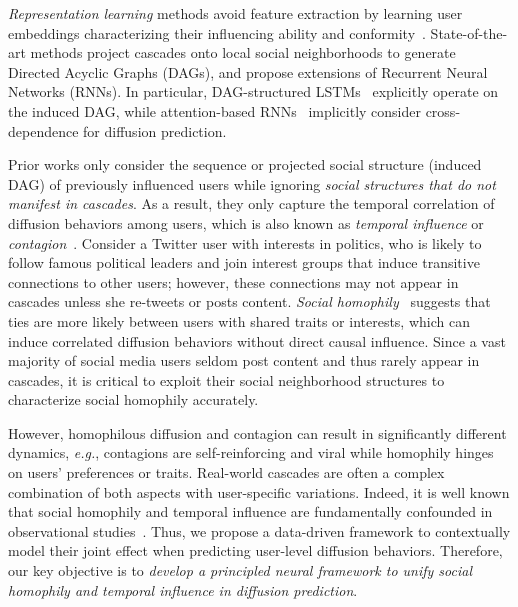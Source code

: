 \documentclass[sigconf]{acmart}
\begin{document}
\textit{Representation learning} methods avoid feature extraction by learning user embeddings characterizing their influencing ability and conformity~\cite{wsdm16,inf2vec}.
State-of-the-art methods project cascades onto local social neighborhoods to generate Directed Acyclic Graphs (DAGs), and propose extensions of Recurrent Neural Networks (RNNs). In particular, DAG-structured LSTMs~\cite{topolstm} explicitly operate on the induced DAG, while attention-based RNNs~\cite{cyanrnn,deepdiffuse,cikm18_attention} implicitly consider cross-dependence for diffusion prediction.











Prior works only consider the sequence or projected social structure (induced DAG) of previously influenced users while ignoring \textit{social structures that do not manifest in cascades}. As a result, they only capture the temporal correlation of diffusion behaviors among users, which is also known as \textit{temporal influence} or \textit{contagion}~\cite{shalizi}.
Consider a Twitter user with interests in politics, who is likely to follow famous political leaders and join interest groups that induce transitive connections to other users; however, these connections may not appear in cascades unless she re-tweets or posts content. 
\textit{Social homophily}~\cite{homophily} suggests that ties are more likely between users with shared traits or interests, which can induce correlated diffusion behaviors without direct causal influence.
Since a vast majority of social media users seldom post content and thus rarely appear in cascades, it is critical to exploit their social neighborhood structures to characterize social homophily accurately.




However, homophilous diffusion and contagion can result in significantly different dynamics, \textit{e.g.}, contagions are self-reinforcing and viral while homophily hinges on users' preferences or traits.
Real-world cascades are often a complex combination of both aspects with user-specific variations.
Indeed, it is well known that social homophily and temporal influence are fundamentally confounded in observational studies~\cite{shalizi}.
Thus, we propose a data-driven framework to contextually model their joint effect when predicting user-level diffusion behaviors.
Therefore, our key objective is to \textit{develop a principled neural framework to unify social homophily and temporal influence in diffusion prediction}.
\end{document}
